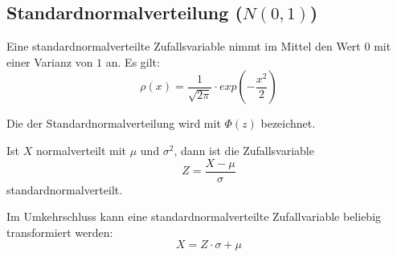 \subsection{Standardnormalverteilung ($N(0,1)$)}
\label{vert-stdnormal}

Eine standardnormalverteilte Zufallsvariable nimmt im Mittel den Wert $0$ mit
einer Varianz von $1$ an. Es gilt:
\[
\rho(x) = \frac{1}{\sqrt{2\pi}}\cdot exp(-\frac{x^2}{2})
\]

Die  der Standardnormalverteilung wird mit $\Phi(z)$ bezeichnet.

Ist $X$ normalverteilt mit $\mu$ und $\sigma^2$, dann ist die Zufallsvariable
\[
Z=\frac{X-\mu}{\sigma}
\]
standardnormalverteilt.

Im Umkehrschluss kann eine standardnormalverteilte Zufallvariable beliebig transformiert werden:
\[
X = Z \cdot \sigma + \mu
\]
